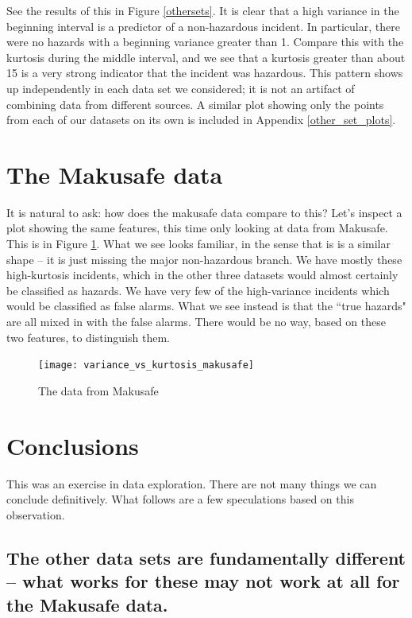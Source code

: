 \documentclass{article}
\begin{document}
See the results of this in Figure \ref{othersets}. It is clear that a high variance in the beginning interval is a predictor of a non-hazardous incident. In particular, there were no hazards with a beginning variance greater than 1. Compare this with the kurtosis during the middle interval, and we see that a kurtosis greater than about 15 is a very strong indicator that the incident was hazardous. This pattern shows up independently in each data set we considered; it is not an artifact of combining data from different sources. A similar plot showing only the points from each of our datasets on its own is included in Appendix \ref{other_set_plots}.

\section{The Makusafe data}

It is natural to ask: how does the makusafe data compare to this? Let's inspect a plot showing the same features, this time only looking at data from Makusafe. This is in Figure \ref{makusafe}. What we see looks familiar, in the sense that is is a similar shape -- it is just missing the major non-hazardous branch. We have mostly these high-kurtosis incidents, which in the other three datasets would almost certainly be classified as hazards. We have very few of the high-variance incidents which would be classified as false alarms. What we see instead is that the ``true hazards" are all mixed in with the false alarms. There would be no way, based on these two features, to distinguish them.

\begin{figure}
\texttt{[image: variance\_vs\_kurtosis\_makusafe]}
\caption{The data from Makusafe}
\label{makusafe}
\end{figure}

\section{Conclusions}

This was an exercise in data exploration. There are not many things we can conclude definitively. What follows are a few speculations based on this observation.

\subsection{The other data sets are fundamentally different -- what works for these may not work at all for the Makusafe data.}
\end{document}
